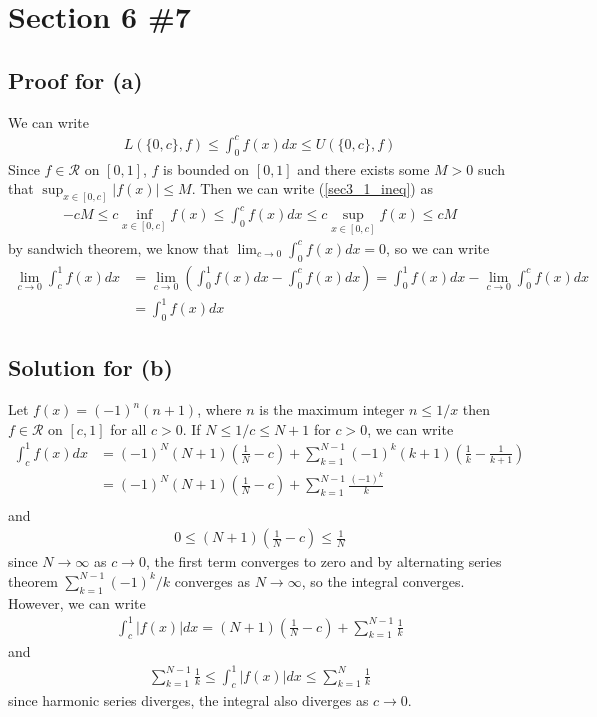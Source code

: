 \documentclass{scrartcl}
\begin{document}
\section{Section 6 \#7}
\subsection{Proof for (a)}
We can write
\begin{align}\label{sec3_1_ineq}
  L(\{0, c\}, f) \leq \int^c_0 f(x) dx \leq U(\{0, c\}, f)
\end{align}
Since \(f \in \mathscr{R}\) on \([0, 1]\), \(f\) is bounded on \([0, 1]\) and there exists some \(M > 0\) such that \(\sup_{x \in [0, c]} |f(x)| \leq M\).
Then we can write (\ref{sec3_1_ineq}) as
\begin{align*}
  -cM \leq c \inf_{x \in [0, c]} f(x) \leq \int^c_0 f(x) dx \leq c \sup_{x \in [0, c]} f(x) \leq cM
\end{align*}
by sandwich theorem, we know that \(\lim_{c \to 0} \int^c_0 f(x) dx = 0\), so we can write
\begin{align*}
  \lim_{c \to 0} \int^1_c f(x) dx
  &= \lim_{c \to 0} \left( \int^1_0 f(x) dx - \int^c_0 f(x) dx \right)
  = \int^1_0 f(x) dx - \lim_{c \to 0} \int^c_0 f(x) dx \\
  &= \int^1_0 f(x) dx
\end{align*}

\subsection{Solution for (b)}
Let \(f(x) = (-1)^n (n + 1)\), where \(n\) is the maximum integer \(n \leq 1 / x\) then \(f \in \mathscr{R}\) on \([c, 1]\) for all \(c > 0\).
If \(N \leq 1 / c \leq N + 1\) for \(c > 0\), we can write
\begin{align*}
  \int^1_c f(x) dx
  &= (-1)^N (N + 1) \left( \frac{1}{N} - c \right) + \sum^{N - 1}_{k = 1} (-1)^k (k + 1) \left( \frac{1}{k} - \frac{1}{k + 1} \right) \\
  &= (-1)^N (N + 1) \left( \frac{1}{N} - c \right) + \sum^{N - 1}_{k = 1} \frac{(-1)^k}{k} \\
\end{align*}
and
\begin{align*}
  0 \leq (N + 1) \left( \frac{1}{N} - c \right) \leq \frac{1}{N}
\end{align*}
since \(N \to \infty\) as \(c \to 0\), the first term converges to zero and by alternating series theorem \(\sum^{N - 1}_{k = 1} (-1)^k / k\) converges as \(N \to \infty\), so the integral converges.
However, we can write
\begin{align*}
\int^1_c |f(x)| dx
= (N + 1) \left( \frac{1}{N} - c \right) + \sum^{N - 1}_{k = 1} \frac{1}{k}
\end{align*}
and
\begin{align*}
  \sum^{N - 1}_{k = 1} \frac{1}{k} \leq \int^1_c |f(x)| dx \leq \sum^N_{k = 1} \frac{1}{k}
\end{align*}
since harmonic series diverges, the integral also diverges as \(c \to 0\).
\end{document}
